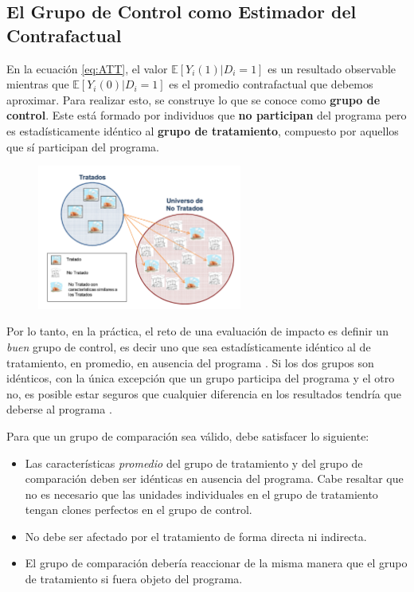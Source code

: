 \documentclass[../../main.tex]{subfiles}
\begin{document}
\subsection{El Grupo de Control como Estimador del Contrafactual}
En la ecuación \ref{eq:ATT}, el valor \(\mathbb{E} \left[Y_i(1)|D_i=1\right]\) es un resultado observable mientras que \(\mathbb{E} \left[Y_i(0)|D_i=1\right]\) es el promedio contrafactual que debemos aproximar. Para realizar esto, se construye lo que se conoce como \textbf{grupo de control}. Este está formado por individuos que \textbf{no participan} del programa pero es estadísticamente idéntico \cite{gertler-2016} al \textbf{grupo de tratamiento}, compuesto por aquellos que sí participan del programa.

\begin{figure}[h!]
    \centering
    \includegraphics[width=0.6\textwidth]{figs/grupo-de-control.png}
    \caption{}
    \label{fig:control-group}
\end{figure}

Por lo tanto, en la práctica, el reto de una evaluación de impacto es definir un \textit{buen} grupo de control, es decir uno que sea estadísticamente idéntico al de tratamiento, en promedio, en ausencia del programa \cite{gertler-2016}. Si los dos grupos son idénticos, con la única excepción que un grupo participa del programa y el otro no, es posible estar seguros que cualquier diferencia en los resultados tendría que deberse al programa \cite{gertler-2016}.

Para que un grupo de comparación sea válido, debe satisfacer lo siguiente:
\begin{itemize}
    \item Las características \textit{promedio} del grupo de tratamiento y del grupo de comparación deben ser idénticas en ausencia del programa. Cabe resaltar que no es necesario que las unidades individuales en el grupo de tratamiento tengan clones perfectos en el grupo de control.
    \item No debe ser afectado por el tratamiento de forma directa ni indirecta.
    \item El grupo de comparación debería reaccionar de la misma manera que el grupo de tratamiento si fuera objeto del programa.
\end{itemize}
\end{document}
